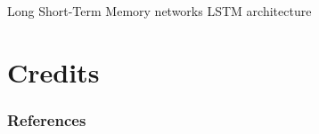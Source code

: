 \documentclass[aspectratio=169]{beamer}
\begin{document}

\begin{frame}{Long Short-Term Memory networks}
LSTM architecture
\end{frame}


\section{Credits}



\begin{frame}[t, allowframebreaks]
\frametitle{References}


\end{frame}
\end{document}
